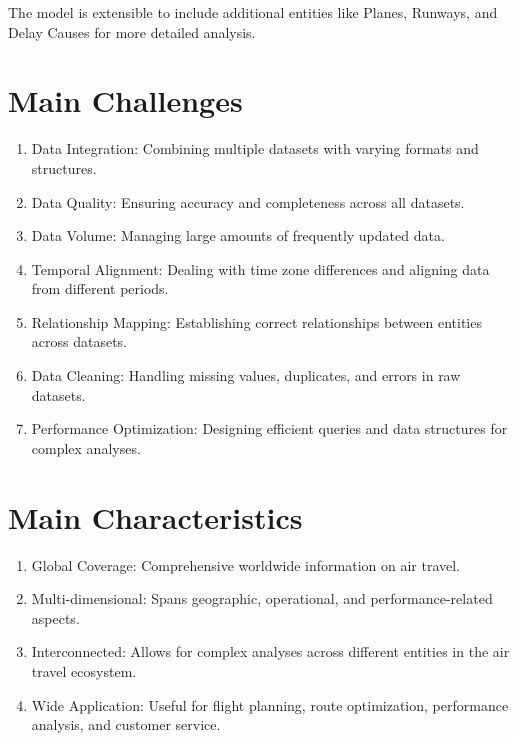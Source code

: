 \documentclass{article}
\begin{document}
The model is extensible to include additional entities like Planes, Runways, and Delay Causes for more detailed analysis.

\section{Main Challenges}

\begin{enumerate}
    \item Data Integration: Combining multiple datasets with varying formats and structures.
    \item Data Quality: Ensuring accuracy and completeness across all datasets.
    \item Data Volume: Managing large amounts of frequently updated data.
    \item Temporal Alignment: Dealing with time zone differences and aligning data from different periods.
    \item Relationship Mapping: Establishing correct relationships between entities across datasets.
    \item Data Cleaning: Handling missing values, duplicates, and errors in raw datasets.
    \item Performance Optimization: Designing efficient queries and data structures for complex analyses.
\end{enumerate}

\section{Main Characteristics}

\begin{enumerate}
    \item Global Coverage: Comprehensive worldwide information on air travel.
    \item Multi-dimensional: Spans geographic, operational, and performance-related aspects.
    \item Interconnected: Allows for complex analyses across different entities in the air travel ecosystem.
    \item Wide Application: Useful for flight planning, route optimization, performance analysis, and customer service.
\end{enumerate}
\end{document}
